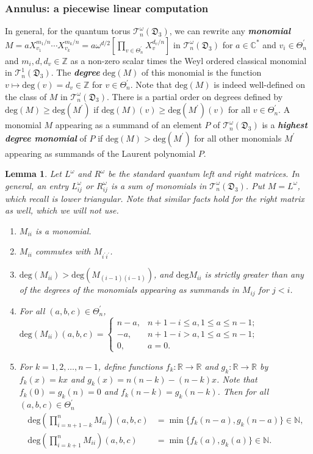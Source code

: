 \documentclass[12pt,
	]{amsart}
\newtheorem{lemma}[theorem]{Lemma}
\theoremstyle{definition}
\newcommand{\mrm}[1]{\mathrm{#1}}
\newcommand{\mbb}[1]{\mathbb{#1}}
\newcommand{\mcal}[1]{\mathcal{#1}}
\newcommand{\mfrak}[1]{\mathfrak{#1}}
\newcommand{\lp}{\left(}\newcommand{\rp}{\right)}
\newcommand{\define}[1]{{\textit{\textbf{#1}}}}
\newcommand{\Z}{\mbb{Z}}
\newcommand{\nnegZ}{\mbb{N}}
\newcommand{\R}{\mbb{R}}
\newcommand{\C}{\mbb{C}}
\newcommand{\sC}{\C^\ast}
\newcommand{\ttriang}{\mfrak{D}_3}
\newcommand{\wroot}{\omega}
\newcommand{\qtorus}[1]{\mcal{T}_n^\wroot(#1)}
\newcommand{\discrete}{\Theta_n}
\newcommand{\cornerlessdiscrete}{\discrete^\prime}
\newcommand{\cltorus}[1]{\mcal{T}_n^1(#1)}
\newcommand{\qleftmat}{L^\wroot}
\newcommand{\qrightmat}{R^\wroot}
\newcommand{\degree}{\mrm{deg}}
\begin{document}
\subsubsection{Annulus:  a piecewise linear computation}\label{sssec:annuluscomputationsomemoregeneralities}

In general, for the quantum torus $\qtorus{\ttriang}$, we can rewrite any \define{monomial} $M=aX_{v_1}^{m_1/n}\cdots X_{v_k}^{m_k/n}=a\wroot^{d/2}[\prod_{v\in\cornerlessdiscrete}X_v^{d_v/n}]$ in $\qtorus{\ttriang}$ for $a\in\sC$ and $v_i\in\cornerlessdiscrete$ and $m_i,d,d_v\in\Z$ as a non-zero scalar times the Weyl ordered classical monomial in $\cltorus{\ttriang}$.  The \define{degree} $\degree(M)$ of this monomial is the function $v\mapsto \degree(v)=d_v\in\Z$ for $v\in\cornerlessdiscrete$.  Note that $\degree(M)$ is indeed well-defined on the class of $M$ in $\qtorus{\ttriang}$.  There is a partial order on degrees defined by $\degree(M)\geq\degree(M^\prime)$ if $\degree(M)(v)\geq\degree(M^\prime)(v)$ for all $v\in\cornerlessdiscrete$.  A monomial $M$ appearing as a summand of an element $P$ of $\qtorus{\ttriang}$ is a \define{highest degree monomial} of $P$ if $\degree(M)>\degree(M^\prime)$ for all other monomials $M^\prime$ appearing as summands of the Laurent polynomial $P$.  

\begin{lemma}\label{lem:maincalculationallemma}
Let $\qleftmat$ and $\qrightmat$ be the standard quantum left and right matrices.  In general, an entry $\qleftmat_{ij}$ or $\qrightmat_{ij}$ is a sum of monomials in $\qtorus{\ttriang}$.  Put $M=\qleftmat$, which recall is lower triangular.  Note that similar facts hold for the right matrix as well, which we will not use.
\begin{enumerate}
\item  $M_{ii}$ is a monomial.
\item  $M_{ii}$ commutes with $M_{i^\prime i^\prime}$.  
\item  $\degree(M_{ii})>\degree(M_{(i-1)(i-1)})$, and $\degree{M}_{ii}$ is strictly greater than any of the degrees of the monomials appearing as summands in $M_{ij}$ for $j<i$. 
\item  For all $(a,b,c)\in\cornerlessdiscrete$, $\degree(M_{ii})(a,b,c)=\begin{cases}n-a,&n+1-i\leq a,1\leq a\leq n-1;\\-a,&n+1-i>a,1\leq a\leq n-1;\\0,&a=0.\end{cases}$  
\item  For $k=1,2,\dots,n-1$, define functions $f_k:\R\to\R$ and $g_k:\R\to\R$ by $f_k(x)=kx$ and $g_k(x)=n(n-k)-(n-k)x$.  Note that $f_k(0)=g_k(n)=0$ and $f_k(n-k)=g_k(n-k)$.  Then for all $(a,b,c)\in\cornerlessdiscrete$
\begin{align*}
\degree\lp\prod_{i=n+1-k}^n M_{ii}\rp(a,b,c)&=\min\{f_k(n-a),g_k(n-a)\}\in\nnegZ,\\
\degree\lp\prod_{i=k+1}^n M_{ii}\rp(a,b,c)&=\min\{f_k(a),g_k(a)\}\in\nnegZ.
\end{align*}
\end{enumerate}
\end{lemma}
\end{document}
